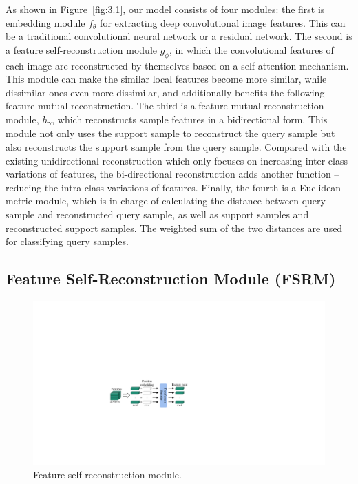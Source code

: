 \documentclass[letterpaper]{article} %
\begin{document}
As shown in Figure~\ref{fig:3.1}, our model consists of four modules: 
the first is embedding module $f_{\theta}$ for extracting deep convolutional image features. This can be a traditional convolutional neural network or a residual network.
The second is a feature self-reconstruction module $g_{\phi}$, in which the convolutional features of each image are reconstructed by themselves based on a self-attention mechanism. 
This module can make the similar local features become more similar, while dissimilar ones even more dissimilar, and additionally benefits the following feature mutual reconstruction. 
The third is a feature mutual reconstruction module, $h_{\gamma}$, which reconstructs sample features in a bidirectional form. This module not only uses the support sample to reconstruct the query sample but also reconstructs the support sample from the query sample. Compared with the existing unidirectional reconstruction which only focuses on increasing inter-class variations of features, the bi-directional reconstruction adds another function -- reducing the intra-class variations of features. 
Finally, the fourth is a {Euclidean} metric module, which is in charge of calculating the distance between query sample and reconstructed query sample, as well as support samples and reconstructed support samples. The weighted sum of the two distances are used for classifying query samples.
 




\subsection{Feature Self-Reconstruction Module (FSRM)}





\begin{figure}[htp]
\centering
  \includegraphics[width=0.85\linewidth]{figures/3.2.pdf}
  \caption{Feature self-reconstruction module.}
  \label{fig:3.2}
\end{figure}
\end{document}
